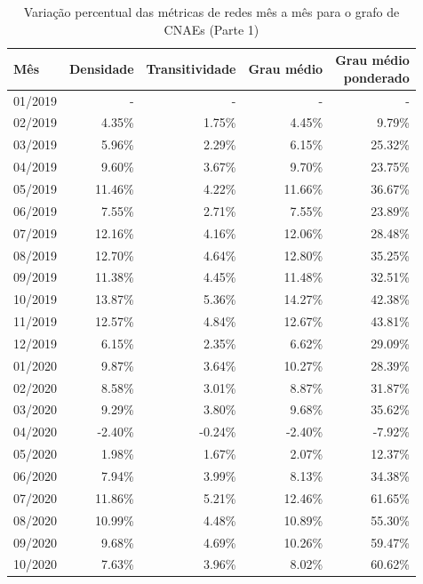 \begin{table}[htb]
\centering
\caption{Variação percentual das métricas de redes mês a mês para o grafo de CNAEs (Parte 1)}
\label{tab:metricas-redes-pandemia:grafo-mensal-por-cnae1}
\begin{tabular}{l|rrrr}
\toprule
Mês & Densidade & Transitividade & Grau médio & \shortstack{Grau médio\\ponderado} \\
\midrule
01/2019 & - & - & - & - \\
02/2019 &  4.35\% &  1.75\% &  4.45\% &  9.79\% \\
03/2019 &  5.96\% &  2.29\% &  6.15\% & 25.32\% \\
04/2019 &  9.60\% &  3.67\% &  9.70\% & 23.75\% \\
05/2019 & 11.46\% &  4.22\% & 11.66\% & 36.67\% \\
06/2019 &  7.55\% &  2.71\% &  7.55\% & 23.89\% \\
07/2019 & 12.16\% &  4.16\% & 12.06\% & 28.48\% \\
08/2019 & 12.70\% &  4.64\% & 12.80\% & 35.25\% \\
09/2019 & 11.38\% &  4.45\% & 11.48\% & 32.51\% \\
10/2019 & 13.87\% &  5.36\% & 14.27\% & 42.38\% \\
11/2019 & 12.57\% &  4.84\% & 12.67\% & 43.81\% \\
12/2019 &  6.15\% &  2.35\% &  6.62\% & 29.09\% \\
01/2020 &  9.87\% &  3.64\% & 10.27\% & 28.39\% \\
02/2020 &  8.58\% &  3.01\% &  8.87\% & 31.87\% \\
03/2020 &  9.29\% &  3.80\% &  9.68\% & 35.62\% \\
04/2020 & -2.40\% & -0.24\% & -2.40\% & -7.92\% \\
05/2020 &  1.98\% &  1.67\% &  2.07\% & 12.37\% \\
06/2020 &  7.94\% &  3.99\% &  8.13\% & 34.38\% \\
07/2020 & 11.86\% &  5.21\% & 12.46\% & 61.65\% \\
08/2020 & 10.99\% &  4.48\% & 10.89\% & 55.30\% \\
09/2020 &  9.68\% &  4.69\% & 10.26\% & 59.47\% \\
10/2020 &  7.63\% &  3.96\% &  8.02\% & 60.62\% \\
\bottomrule
\end{tabular}
\fdadospesquisa
\end{table}

